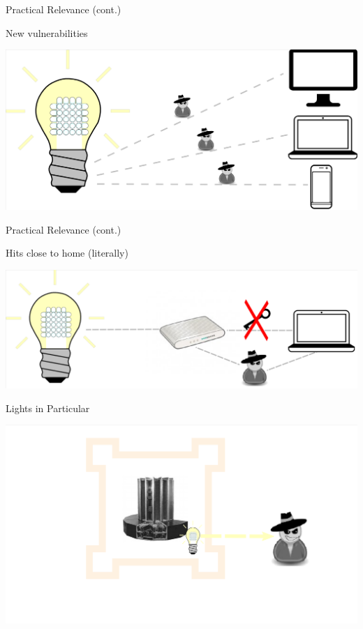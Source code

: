 \documentclass[11pt,t,usepdftitle=false,aspectratio=169]{beamer}
\begin{document}
\begin{frame}{Practical Relevance (cont.)}
	\begin{block}{New vulnerabilities}
	   \begin{center}
		    \includegraphics{img/Vulnerabilities.png}
	   \end{center}        
	\end{block}
\end{frame}

\begin{frame}{Practical Relevance (cont.)}
	\begin{block}{Hits close to home (literally)}
	   \begin{center}
		    \includegraphics{img/HomeSec.png}
	   \end{center}
	\end{block}
\end{frame}


\begin{frame}{Lights in Particular}
	\begin{center}
        \includegraphics{img/DatacenterIoT.png}
    \end{center}
\end{frame}
\end{document}
